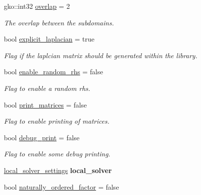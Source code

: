 \begin{DoxyCompactItemize}
gko\+::int32 \hyperlink{structSchwarzWrappers_1_1Settings_ab1be4bd623b4cf1c8999160e753752ff}{overlap} = 2
\begin{DoxyCompactList}\small\item\em The overlap between the subdomains. \end{DoxyCompactList}\item 
bool \hyperlink{structSchwarzWrappers_1_1Settings_a120b05467ef07d770948ccacf12bb1c3}{explicit\+\_\+laplacian} = true
\begin{DoxyCompactList}\small\item\em Flag if the laplcian matrix should be generated within the library. \end{DoxyCompactList}\item 
\mbox{\label{structSchwarzWrappers_1_1Settings_aac87fe7e2f41dcf9ea0abc9d4f919c8b}} 
bool \hyperlink{structSchwarzWrappers_1_1Settings_aac87fe7e2f41dcf9ea0abc9d4f919c8b}{enable\+\_\+random\+\_\+rhs} = false
\begin{DoxyCompactList}\small\item\em Flag to enable a random rhs. \end{DoxyCompactList}\item 
\mbox{\label{structSchwarzWrappers_1_1Settings_ac4141f6be1a3117eb77bcd7af6bc9424}} 
bool \hyperlink{structSchwarzWrappers_1_1Settings_ac4141f6be1a3117eb77bcd7af6bc9424}{print\+\_\+matrices} = false
\begin{DoxyCompactList}\small\item\em Flag to enable printing of matrices. \end{DoxyCompactList}\item 
\mbox{\label{structSchwarzWrappers_1_1Settings_a88048419dd7eb9a21ac3aa8f64986016}} 
bool \hyperlink{structSchwarzWrappers_1_1Settings_a88048419dd7eb9a21ac3aa8f64986016}{debug\+\_\+print} = false
\begin{DoxyCompactList}\small\item\em Flag to enable some debug printing. \end{DoxyCompactList}\item 
\hyperlink{structSchwarzWrappers_1_1Settings_abb00a70a7c715c93a2e7570ad6dc1bbe}{local\+\_\+solver\+\_\+settings} {\bfseries local\+\_\+solver}
\item 
bool \hyperlink{structSchwarzWrappers_1_1Settings_afd0d2bf6e98da07012fd08260114de17}{naturally\+\_\+ordered\+\_\+factor} = false

\end{DoxyCompactItemize}
